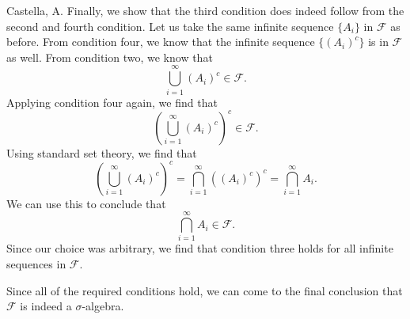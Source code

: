 \begin{solution}[2.4]{Castella, A.}
    Finally, we show that the third condition does indeed follow from the second and fourth condition. Let us take the same infinite sequence $\{A_i\}$ in $\mathcal{F}$ as before. From condition four, we know that the infinite sequence $\{(A_i)^c\}$ is in $\mathcal{F}$ as well. From condition two, we know that
    $$
        \bigcup_{i=1}^\infty (A_i)^c \in \mathcal{F}.
    $$
    Applying condition four again, we find that
    $$
        \left(\bigcup_{i=1}^\infty (A_i)^c\right)^c \in \mathcal{F}.
    $$
    Using standard set theory, we find that
    $$
        \left(\bigcup_{i=1}^\infty (A_i)^c\right)^c = \bigcap_{i=1}^\infty \left((A_i)^c\right)^c = \bigcap_{i=1}^\infty A_i.
    $$
    We can use this to conclude that
    $$
        \bigcap_{i=1}^\infty A_i \in \mathcal{F}.
    $$
    Since our choice was arbitrary, we find that condition three holds for all infinite sequences in $\mathcal{F}$.
    
    Since all of the required conditions hold, we can come to the final conclusion that $\mathcal{F}$ is indeed a $\sigma$-algebra.
\end{solution}

